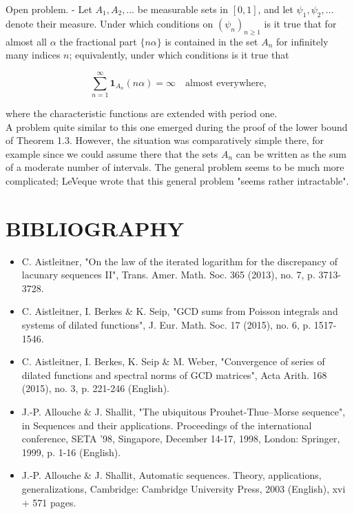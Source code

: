 \documentclass[10pt]{article}
\newcommand{\1}{\mathbf{1}}
\begin{document}
Open problem. - Let $A_{1}, A_{2}, \ldots$ be measurable sets in $[0,1]$, and let $\psi_1,\psi_2,\ldots$ denote their measure. Under which conditions on $\left(\psi_{n}\right)_{n \geqslant 1}$ is it true that for almost all $\alpha$ the fractional part $\{n \alpha\}$ is contained in the set $A_{n}$ for infinitely many indices $n$; equivalently, under which conditions is it true that

$$
\sum_{n=1}^{\infty} \mathbf{1}_{A_{n}}(n \alpha)=\infty \quad\text{almost everywhere},
$$

where the characteristic functions are extended with period one.\\
A problem quite similar to this one emerged during the proof of the lower bound of Theorem 1.3. However, the situation was comparatively simple there, for example since we could assume there that the sets $A_{n}$ can be written as the sum of a moderate number of intervals. The general problem seems to be much more complicated; LeVeque wrote that this general problem "seems rather intractable".

\section*{BIBLIOGRAPHY}
\begin{itemize}
  \item[] [1] C. Aistleitner, "On the law of the iterated logarithm for the discrepancy of lacunary sequences II", Trans. Amer. Math. Soc. 365 (2013), no. 7, p. 3713-3728.
  \item[] [2] C. Aistleitner, I. Berkes \& K. Seip, "GCD sums from Poisson integrals and systems of dilated functions", J. Eur. Math. Soc. 17 (2015), no. 6, p. 1517-1546.
  \item[] [3] C. Aistleitner, I. Berkes, K. Seip \& M. Weber, "Convergence of series of dilated functions and spectral norms of GCD matrices", Acta Arith. 168 (2015), no. 3, p. 221-246 (English).
  \item[] [4] J.-P. Allouche \& J. Shallit, "The ubiquitous Prouhet-Thue--Morse sequence", in Sequences and their applications. Proceedings of the international conference, SETA '98, Singapore, December 14-17, 1998, London: Springer, 1999, p. 1-16 (English).
  \item[] [5] J.-P. Allouche \& J. Shallit, Automatic sequences. Theory, applications, generalizations, Cambridge: Cambridge University Press, 2003 (English), xvi + 571 pages.
\end{itemize}
\end{document}
